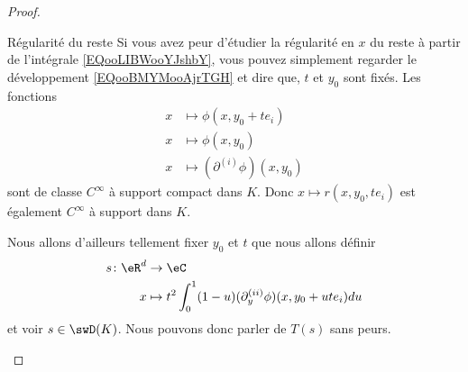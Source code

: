 \begin{proof}
\begin{subproof}
        \item[Régularité du reste]
            Si vous avez peur d'étudier la régularité en \( x\) du reste à partir de l'intégrale \eqref{EQooLIBWooYJshbY}, vous pouvez simplement regarder le développement \eqref{EQooBMYMooAjrTGH} et dire que, \( t\) et \( y_0\) sont fixés. Les fonctions
            \begin{subequations}
                \begin{align}
                    x&\mapsto \phi(x, y_0+te_i)\\
                    x&\mapsto \phi(x, y_0)\\
                    x&\mapsto (\partial^{(i)}\phi)(x,y_0)
                \end{align}
            \end{subequations}
            sont de classe \(  C^{\infty}\) à support compact dans \( K\). Donc \( x\mapsto r(x,y_0,te_i)\) est également \(  C^{\infty}\) à support dans \( K\).

            Nous allons d'ailleurs tellement fixer \( y_0\) et \( t\) que nous allons définir
            \begin{equation}
                \begin{aligned}
                    s\colon \eR^d&\to \eC \\
                    x&\mapsto  t^2\int_0^1(1-u)(\partial_y^{(ii)}\phi)(x,y_0+ute_i)du
                \end{aligned}
            \end{equation}
            et voir \( s\in\swD(K)\). Nous pouvons donc parler de \( T(s)\) sans peurs.


\end{subproof}
\end{proof}
